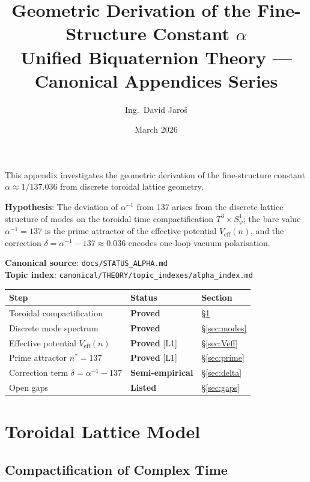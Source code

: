 \documentclass[11pt,a4paper]{article}
\title{\textbf{Geometric Derivation of the Fine-Structure Constant $\alpha$}\\
\large Unified Biquaternion Theory — Canonical Appendices Series}
\author{Ing.\ David Jaroš}
\date{March 2026}
\theoremstyle{definition}
\theoremstyle{remark}
\begin{document}
\maketitle
\tableofcontents
\bigskip

\begin{tcolorbox}[colback=blue!4!white,colframe=blue!50!black,title=Purpose and Status]
This appendix investigates the geometric derivation of the fine-structure constant
$\alpha \approx 1/137.036$ from discrete toroidal lattice geometry.

\medskip
\textbf{Hypothesis}: The deviation of $\alpha^{-1}$ from 137 arises from the discrete
lattice structure of modes on the toroidal time compactification
$T^3 \times S^1_\psi$; the bare value $\alpha^{-1} = 137$ is the prime attractor
of the effective potential $V_{\mathrm{eff}}(n)$, and the correction
$\delta = \alpha^{-1} - 137 \approx 0.036$ encodes one-loop vacuum polarisation.

\medskip
\textbf{Canonical source}: \texttt{docs/STATUS\_ALPHA.md}\\
\textbf{Topic index}: \texttt{canonical/THEORY/topic\_indexes/alpha\_index.md}

\medskip
\begin{tabular}{lll}
\hline
Step & Status & Section \\
\hline
Toroidal compactification & \textbf{Proved} & \S\ref{sec:torus} \\
Discrete mode spectrum & \textbf{Proved} & \S\ref{sec:modes} \\
Effective potential $V_{\mathrm{eff}}(n)$ & \textbf{Proved} [L1] & \S\ref{sec:Veff} \\
Prime attractor $n^* = 137$ & \textbf{Proved} [L1] & \S\ref{sec:prime} \\
Correction term $\delta = \alpha^{-1}-137$ & \textbf{Semi-empirical} & \S\ref{sec:delta} \\
Open gaps & \textbf{Listed} & \S\ref{sec:gaps} \\
\hline
\end{tabular}
\end{tcolorbox}

\section{Toroidal Lattice Model}\label{sec:torus}

\subsection{Compactification of Complex Time}
\end{document}
